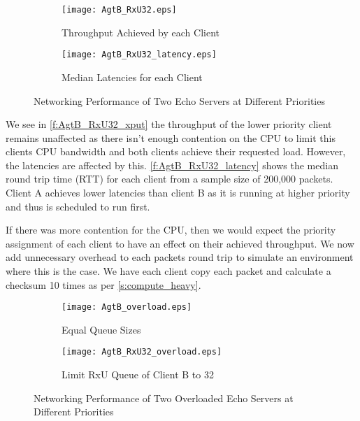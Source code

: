 \noindent\begin{figure}[htbp]
    \centering
	\begin{multicols}{2}
		\begin{subfigure}[b]{0.45\textwidth}
        \centering
        \texttt{[image: AgtB\_RxU32.eps]}
        \caption{Throughput Achieved by each Client}
        \label{f:AgtB_RxU32_xput}
    \end{subfigure}\qquad
    \begin{subfigure}[b]{0.45\textwidth}
        \vspace{39pt}
        \centering
        \texttt{[image: AgtB\_RxU32\_latency.eps]}
        \caption{Median Latencies for each Client}
        \label{f:AgtB_RxU32_latency}
    \end{subfigure}
\end{multicols}
\caption{Networking Performance of Two Echo Servers at Different Priorities}
\label{f:AgtB_RxU32}
\end{figure}

We see in \autoref{f:AgtB_RxU32_xput} the throughput of the lower priority client remains unaffected as there isn't enough
contention on the CPU to limit this clients CPU bandwidth and both clients achieve their requested load.
However, the latencies are affected by this. \autoref{f:AgtB_RxU32_latency} shows the median round trip time (RTT)
for each client from a sample size of 200,000 packets. Client A achieves lower latencies than client B as it is running
at higher priority and thus is scheduled to run first.

If there was more contention for the CPU, then we would expect the priority assignment of each client to have an effect
on their achieved throughput. We now add unnecessary overhead to each packets round trip to simulate an environment where
this is the case. We have each client copy each packet and calculate a checksum 10 times as per \autoref{s:compute_heavy}. 

\noindent\begin{figure}[h]
    \centering
	\begin{multicols}{2}
		\begin{subfigure}[b]{0.45\textwidth}
        \centering
        \texttt{[image: AgtB\_overload.eps]}
        \caption{Equal Queue Sizes}
        \label{f:AgtB_overload}
    \end{subfigure}\qquad
    \begin{subfigure}[b]{0.45\textwidth}
        \centering
        \texttt{[image: AgtB\_RxU32\_overload.eps]}
        \caption{Limit RxU Queue of Client B to 32}
        \label{f:AgtB_RxU32_overload}
    \end{subfigure}
\end{multicols}
\caption{Networking Performance of Two Overloaded Echo Servers at Different Priorities}
\label{f:AgtB_od}
\end{figure}

